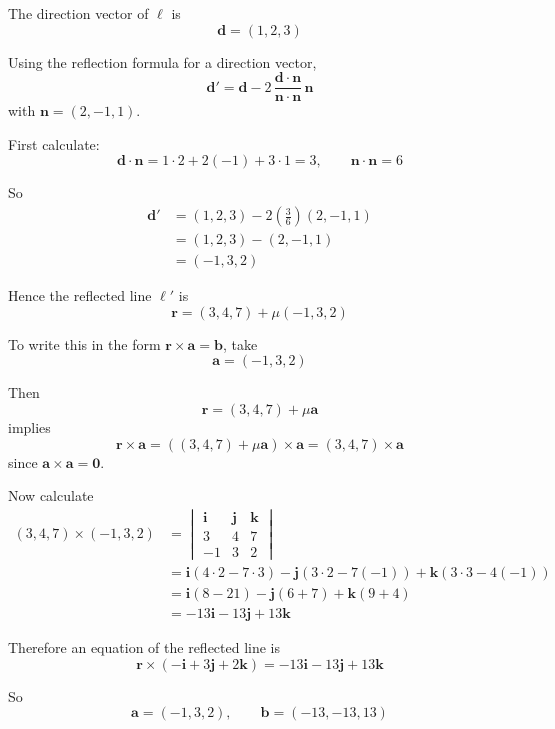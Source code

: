\documentclass[leqno]{article}
\begin{document}
\begin{enumerate}[
  label=\textbf{\arabic*.},
  leftmargin=*,
  topsep=0pt,
  partopsep=0pt,
  parsep=0pt
]
\begin{tcolorbox}[colback=white, colframe=scarlet, title={\textbf{Solution}}, breakable, grow to left by=6mm, grow to right by=10mm]
\begin{enumerate}[label=\textbf{(\alph*)}]
  The direction vector of \(\ell\) is
  \[
  \mathbf d=(1,2,3)
  \]

  Using the reflection formula for a direction vector,
  \[
  \mathbf d'
  =\mathbf d-2\,\frac{\mathbf d\cdot\mathbf n}{\mathbf n\cdot\mathbf n}\,\mathbf n
  \]
  with \(\mathbf n=(2,-1,1)\).

  First calculate:
  \[
  \mathbf d\cdot\mathbf n=1\cdot 2+2(-1)+3\cdot 1=3,
  \qquad
  \mathbf n\cdot\mathbf n=6
  \]

  So
  \begin{align*}
  \mathbf d'
  &=(1,2,3)-2\left(\frac{3}{6}\right)(2,-1,1)\\
  &=(1,2,3)-(2,-1,1)\\
  &=(-1,3,2)
  \end{align*}

  Hence the reflected line \(\ell'\) is
  \[
  \mathbf r=(3,4,7)+\mu(-1,3,2)
  \]

  To write this in the form \(\mathbf r\times\mathbf a=\mathbf b\), take
  \[
  \mathbf a=(-1,3,2)
  \]

  Then
  \[
  \mathbf r=(3,4,7)+\mu\mathbf a
  \]
  implies
  \[
  \mathbf r\times\mathbf a=((3,4,7)+\mu\mathbf a)\times\mathbf a=(3,4,7)\times\mathbf a
  \]
  since \(\mathbf a\times\mathbf a=\mathbf 0\).

  Now calculate
  \begin{align*}
  (3,4,7)\times(-1,3,2)
  &=\begin{vmatrix}
  \mathbf i & \mathbf j & \mathbf k\\
  3&4&7\\
  -1&3&2
  \end{vmatrix}\\
  &=\mathbf i(4\cdot 2-7\cdot 3)-\mathbf j(3\cdot 2-7(-1))+\mathbf k(3\cdot 3-4(-1))\\
  &=\mathbf i(8-21)-\mathbf j(6+7)+\mathbf k(9+4)\\
  &=-13\mathbf i-13\mathbf j+13\mathbf k
  \end{align*}

  Therefore an equation of the reflected line is
  \[
  \mathbf r\times(-\mathbf i+3\mathbf j+2\mathbf k)=-13\mathbf i-13\mathbf j+13\mathbf k
  \]

  So
  \[
  \mathbf a=(-1,3,2),\qquad \mathbf b=(-13,-13,13)
  \]
\end{enumerate}
\end{tcolorbox}


\end{enumerate}
\end{document}
